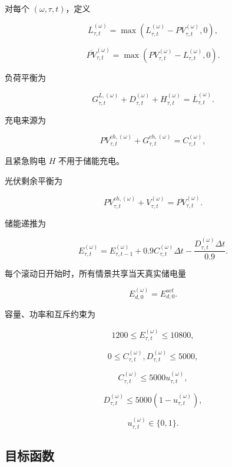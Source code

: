 对每个 \((\omega,\tau,t)\)，定义

\[
\overline L_{\tau,t}^{(\omega)}
=
\max
\left(
L_{\tau,t}^{(\omega)}
-
PV_{\tau,t}^{(\omega)},
0
\right),
\]

\[
\overline{PV}_{\tau,t}^{(\omega)}
=
\max
\left(
PV_{\tau,t}^{(\omega)}
-
L_{\tau,t}^{(\omega)},
0
\right).
\]

负荷平衡为

\begin{equation}
G^{L,(\omega)}_{\tau,t}
+
D^{(\omega)}_{\tau,t}
+
H^{(\omega)}_{\tau,t}
=
\overline L_{\tau,t}^{(\omega)}.
\end{equation}

充电来源为

\begin{equation}
PV^{ch,(\omega)}_{\tau,t}
+
G^{ch,(\omega)}_{\tau,t}
=
C^{(\omega)}_{\tau,t},
\end{equation}

且紧急购电 \(H\) 不用于储能充电。

光伏剩余平衡为

\begin{equation}
PV^{ch,(\omega)}_{\tau,t}
+
V^{(\omega)}_{\tau,t}
=
\overline{PV}_{\tau,t}^{(\omega)}.
\end{equation}

储能递推为

\begin{equation}
E^{(\omega)}_{\tau,t}
=
E^{(\omega)}_{\tau,t-1}
+
0.9C^{(\omega)}_{\tau,t}\Delta t
-
\frac{D^{(\omega)}_{\tau,t}\Delta t}{0.9}.
\end{equation}

每个滚动日开始时，所有情景共享当天真实储电量

\begin{equation}
E^{(\omega)}_{d,0}
=
E^{act}_{d,0}.
\end{equation}

容量、功率和互斥约束为

\[
1200\le E^{(\omega)}_{\tau,t}\le10800,
\]

\[
0\le C^{(\omega)}_{\tau,t},D^{(\omega)}_{\tau,t}\le5000,
\]

\[
C^{(\omega)}_{\tau,t}
\le5000u^{(\omega)}_{\tau,t},
\]

\[
D^{(\omega)}_{\tau,t}
\le5000(1-u^{(\omega)}_{\tau,t}),
\]

\begin{equation}
u^{(\omega)}_{\tau,t}\in\{0,1\}.
\end{equation}

\subsection{目标函数}


